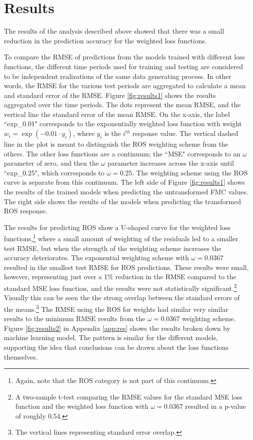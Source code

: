 \documentclass[11pt]{article}%
\begin{document}
\section{Results}

The results of the analysis described above showed that there was a small reduction in the prediction accuracy for the weighted loss functions.

To compare the RMSE of predictions from the models trained with different loss functions, the different time periods used for training and testing are considered to be independent realizations of the same data generating process. In other words, the RMSE for the various test periods are aggregated to calculate a mean and standard error of the RMSE. Figure \ref{fig:results1} shows the results aggregated over the time periods. The dots represent the mean RMSE, and the vertical line the standard error of the mean RMSE. On the x-axis, the label ``exp\_0.01" corresponds to the exponentially weighted loss function with weight $w_i = \exp(-0.01\cdot y_i)$, where $y_i$ is the $i^{th}$ response value. The vertical dashed line in the plot is meant to distinguish the ROS weighting scheme from the others. The other loss functions are a continuum; the ``MSE" corresponds to an $\omega$ parameter of zero, and then the $\omega$ parameter increases across the x-axis until ``exp\_0.25", which corresponds to $\omega=0.25$. The weighting scheme using the ROS curve is separate from this continuum. The left side of Figure \ref{fig:results1} shows the results of the trained models when predicting the untransformed FMC values. The right side shows the results of the models when predicting the transformed ROS response.

The results for predicting ROS show a U-shaped curve for the weighted loss functions,\footnote{Again, note that the ROS category is not part of this continuum.} where a small amount of weighting of the residuals led to a smaller test RMSE, but when the strength of the weighting scheme increases the accuracy deteriorates. The exponential weighting scheme with $\omega = 0.0367$ resulted in the smallest test RMSE for ROS predictions. These results were small, however, representing just over a 1\% reduction in the RMSE compared to the standard MSE loss function, and the results were not statistically significant.\footnote{A two-sample t-test comparing the RMSE values for the standard MSE loss function and the weighted loss function with $\omega = 0.0367$ resulted in a p-value of roughly 0.54.} Visually this can be seen the the strong overlap between the standard errors of the means.\footnote{The vertical lines representing standard error overlap.} The RMSE using the ROS for weights had similar very similar results to the minimum RMSE results from the $\omega = 0.0367$ weighting scheme. Figure \ref{fig:results2} in Appendix \ref{app:res} shows the results broken down by machine learning model. The pattern is similar for the different models, supporting the idea that conclusions can be drawn about the loss functions themselves.
\end{document}
